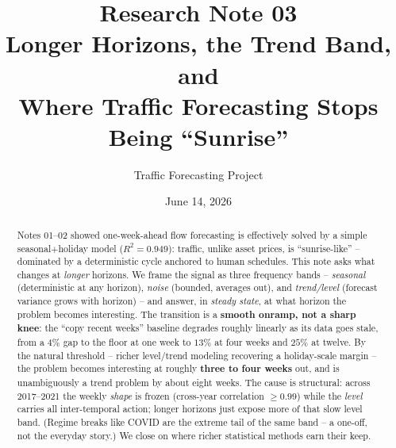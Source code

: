 \documentclass[11pt]{article}
\title{\textbf{Research Note 03}\\[2pt]
Longer Horizons, the Trend Band, and\\ Where Traffic Forecasting Stops Being ``Sunrise''}
\author{Traffic Forecasting Project}
\date{June 14, 2026}
\begin{document}
\maketitle

\begin{abstract}
\sloppy
\noindent
Notes 01--02 showed one-week-ahead flow forecasting is effectively solved by a
simple seasonal$+$holiday model ($R^2{=}0.949$): traffic, unlike asset prices, is
``sunrise-like'' -- dominated by a deterministic cycle anchored to human
schedules. This note asks what changes at \emph{longer} horizons. We frame the
signal as three frequency bands -- \emph{seasonal} (deterministic at any
horizon), \emph{noise} (bounded, averages out), and \emph{trend/level} (forecast
variance grows with horizon) -- and answer, in \emph{steady state}, at what
horizon the problem becomes interesting. The transition is a \textbf{smooth
onramp, not a sharp knee}: the ``copy recent weeks'' baseline degrades roughly
linearly as its data goes stale, from a $4\%$ gap to the floor at one week to
$13\%$ at four weeks and $25\%$ at twelve. By the natural threshold -- richer
level/trend
modeling recovering a holiday-scale margin -- the problem becomes interesting at
roughly \textbf{three to four weeks} out, and is unambiguously a trend problem by
about eight weeks. The cause is structural: across 2017--2021 the weekly \emph{shape}
is frozen (cross-year correlation $\ge0.99$) while the \emph{level} carries all
inter-temporal action; longer horizons just expose more of that slow level band.
(Regime breaks like COVID are the extreme tail of the same band -- a one-off, not
the everyday story.) We close on where richer statistical methods earn their keep.
\end{abstract}
\end{document}
